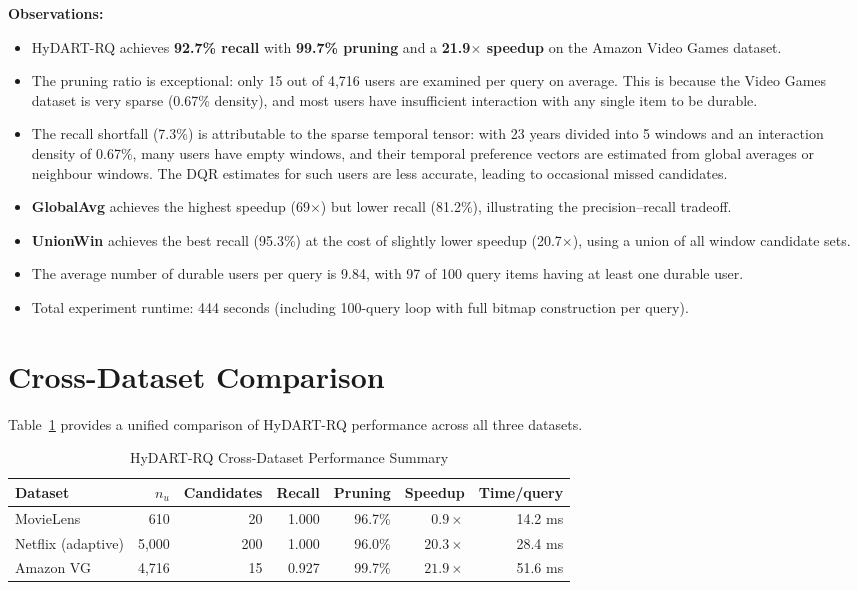 \textbf{Observations:}
\begin{itemize}
  \item HyDART-RQ achieves \textbf{92.7\% recall} with \textbf{99.7\% pruning} and a \textbf{21.9$\times$ speedup} on the Amazon Video Games dataset.
  \item The pruning ratio is exceptional: only 15 out of 4{,}716 users are examined per query on average. This is because the Video Games dataset is very sparse (0.67\% density), and most users have insufficient interaction with any single item to be durable.
  \item The recall shortfall (7.3\%) is attributable to the sparse temporal tensor: with 23 years divided into 5 windows and an interaction density of 0.67\%, many users have empty windows, and their temporal preference vectors are estimated from global averages or neighbour windows. The DQR estimates for such users are less accurate, leading to occasional missed candidates.
  \item \textbf{GlobalAvg} achieves the highest speedup (69$\times$) but lower recall (81.2\%), illustrating the precision--recall tradeoff.
  \item \textbf{UnionWin} achieves the best recall (95.3\%) at the cost of slightly lower speedup (20.7$\times$), using a union of all window candidate sets.
  \item The average number of durable users per query is 9.84, with 97 of 100 query items having at least one durable user.
  \item Total experiment runtime: 444 seconds (including 100-query loop with full bitmap construction per query).
\end{itemize}

\section{Cross-Dataset Comparison}

Table~\ref{tab:crossdataset} provides a unified comparison of HyDART-RQ performance across all three datasets.

\begin{table}[htbp]
\centering
\caption{HyDART-RQ Cross-Dataset Performance Summary}
\label{tab:crossdataset}
\begin{tabular}{lrrrrrr}
\toprule
\textbf{Dataset} & $n_u$ & \textbf{Candidates} & \textbf{Recall} & \textbf{Pruning} & \textbf{Speedup} & \textbf{Time/query} \\
\midrule
MovieLens    &    610 &   20 & 1.000 & 96.7\% & $0.9\times$  & 14.2 ms \\
Netflix (adaptive) & 5{,}000 & 200 & 1.000 & 96.0\% & $20.3\times$ & 28.4 ms \\
Amazon VG    & 4{,}716 &   15 & 0.927 & 99.7\% & $21.9\times$ & 51.6 ms \\
\bottomrule
\end{tabular}
\end{table}

